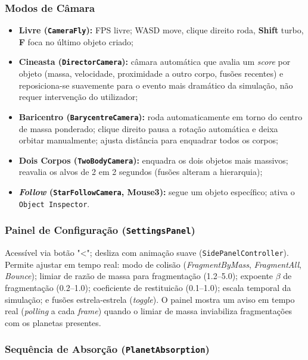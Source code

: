 \documentclass[12pt,a4paper]{article}
\begin{document}
\subsubsection{Modos de C\^{a}mara}

\begin{itemize}
  \item \textbf{Livre (\texttt{CameraFly}):} FPS livre; WASD move, clique direito roda, \textbf{Shift} turbo, \textbf{F} foca no \'{u}ltimo objeto criado;
  \item \textbf{Cineasta (\texttt{DirectorCamera}):} c\^{a}mara autom\'{a}tica que avalia um \textit{score} por objeto (massa, velocidade, proximidade a outro corpo, fus\~{o}es recentes) e reposiciona-se suavemente para o evento mais dram\'{a}tico da simula\c{c}\~{a}o, n\~{a}o requer interven\c{c}\~{a}o do utilizador;
  \item \textbf{Baricentro (\texttt{BarycentreCamera}):} roda automaticamente em torno do centro de massa ponderado; clique direito pausa a rota\c{c}\~{a}o autom\'{a}tica e deixa orbitar manualmente; ajusta dist\^{a}ncia para enquadrar todos os corpos;
  \item \textbf{Dois Corpos (\texttt{TwoBodyCamera}):} enquadra os dois objetos mais massivos; reavalia os alvos de 2 em 2 segundos (fus\~{o}es alteram a hierarquia);
  \item \textbf{\textit{Follow} (\texttt{StarFollowCamera}, Mouse3):} segue um objeto espec\'{i}fico; ativa o \texttt{Object\ Inspector}.
\end{itemize}

\subsubsection{Painel de Configura\c{c}\~{a}o (\texttt{SettingsPanel})}

Acess\'{i}vel via bot\~{a}o "<"; desliza com anima\c{c}\~{a}o suave (\texttt{SidePanelController}). Permite ajustar em tempo real:
modo de colis\~{a}o (\textit{FragmentByMass}, \textit{FragmentAll}, \textit{Bounce});
limiar de raz\~{a}o de massa para fragmenta\c{c}\~{a}o (1.2--5.0);
expoente $\beta$ de fragmenta\c{c}\~{a}o (0.2--1.0);
coeficiente de restituic\~{a}o (0.1--1.0);
escala temporal da simula\c{c}\~{a}o;
e fus\~{o}es estrela-estrela (\textit{toggle}).
O painel mostra um aviso em tempo real (\textit{polling} a cada \textit{frame}) quando o limiar de massa inviabiliza fragmenta\c{c}\~{o}es com os planetas presentes.

\subsubsection{Sequ\^{e}ncia de Absor\c{c}\~{a}o (\texttt{PlanetAbsorption})}
\end{document}
